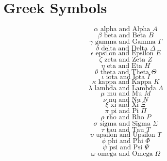     \chapter*{Greek Symbols}

      $$\alpha \text{ alpha and Alpha } A$$
      $$\beta \text{ beta and Beta } B$$
      $$\gamma \text{ gamma and Gamma } \Gamma$$
      $$\delta \text{ delta and Delta } \Delta$$
      $$\epsilon \text{ epsilon and Epsilon } E$$
      $$\zeta \text{ zeta and Zeta } Z$$
      $$\eta \text{ eta and Eta } H$$
      $$\theta \text{ theta and Theta } \Theta$$
      $$\iota \text{ iota and Iota } I$$
      $$\kappa \text{ kappa and Kappa } K$$
      $$\lambda \text{ lambda and Lambda } \Lambda$$
      $$\mu \text{ mu and Mu } M$$
      $$\nu \text{ nu and Nu } N$$
      $$\xi \text{ xi and Xi } \Xi$$
      $$\pi \text{ pi and Pi } \Pi$$
      $$\rho \text{ rho and Rho } P$$
      $$\sigma \text{ sigma and Sigma } \Sigma$$
      $$\tau \text{ tau and Tau } T$$
      $$\upsilon \text{ upsilon and Upsilon } \Upsilon$$
      $$\phi \text{ phi and Phi } \Phi$$
      $$\psi \text{ psi and Psi } \Psi$$
      $$\omega \text{ omega and Omega } \Omega$$